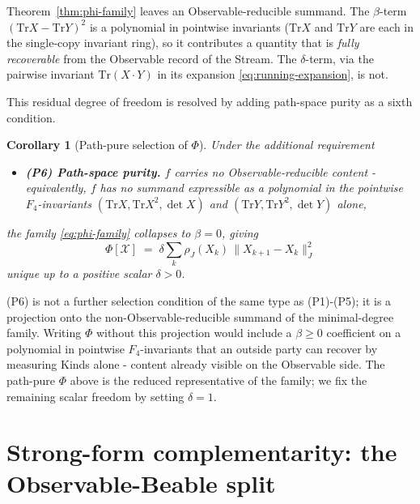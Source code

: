 \documentclass[12pt]{article}
\newtheorem{corollary}[theorem]{Corollary}
\theoremstyle{remark}
\newcommand{\Ffour}{F_4}
\newcommand{\rhoJ}{\rho_J}
\newcommand{\Phiexp}{\Phi}
\newcommand{\Stream}{\mathcal{X}}
\newcommand{\Tr}{\mathrm{Tr}}
\newcommand{\Jnorm}[1]{\lVert #1 \rVert_J}
\begin{document}
Theorem~\ref{thm:phi-family} leaves an Observable-reducible summand.
The $\beta$-term $(\Tr X - \Tr Y)^2$ is a polynomial in pointwise
invariants ($\Tr X$ and $\Tr Y$ are each in the single-copy invariant
ring), so it contributes a quantity that is \emph{fully recoverable}
from the Observable record of the Stream. The $\delta$-term, via the
pairwise invariant $\Tr(X \cdot Y)$ in its expansion
\eqref{eq:running-expansion}, is not.

This residual degree of freedom is resolved by adding path-space purity
as a sixth condition.

\begin{corollary}[Path-pure selection of $\Phiexp$]\label{cor:phi-canonical}
Under the additional requirement
\begin{itemize}[leftmargin=2em]
\item \textbf{(P6) Path-space purity.} $f$ carries no
Observable-reducible content - equivalently, $f$ has no summand
expressible as a polynomial in the pointwise $\Ffour$-invariants
$(\Tr X, \Tr X^2, \det X)$ and
$(\Tr Y, \Tr Y^2, \det Y)$ alone,
\end{itemize}
the family \eqref{eq:phi-family} collapses to $\beta = 0$, giving
\begin{equation}\label{eq:phi-canonical}
  \boxed{\;\Phiexp[\Stream] \;=\; \delta \sum_k \rhoJ(X_k)\,\Jnorm{X_{k+1} - X_k}^2\;}
\end{equation}
unique up to a positive scalar $\delta > 0$.
\end{corollary}

(P6) is not a further selection condition of the same type as
(P1)-(P5); it is a projection onto the non-Observable-reducible
summand of the minimal-degree family. Writing $\Phiexp$ without this
projection would include a $\beta \geq 0$ coefficient on a
polynomial in pointwise $\Ffour$-invariants that an outside party
can recover by measuring Kinds alone - content already visible on
the Observable side. The path-pure $\Phiexp$ above is the reduced
representative of the family; we fix the remaining scalar freedom
by setting $\delta = 1$.


\section{Strong-form complementarity: the Observable-Beable split}
\label{sec:complementarity}
\end{document}
